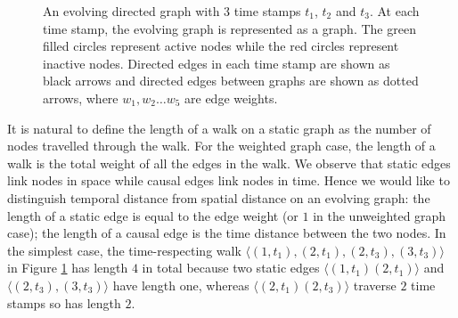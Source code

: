 \documentclass[12pt]{article}
\theoremstyle{definition}
\begin{document}
\begin{figure}[h]
 \begin{center}
\end{center}
\caption{An evolving directed graph with 3 time stamps $t_1$, $t_2$ and $t_3$.
At each time stamp, the evolving graph is represented as a graph.
The green filled circles represent active nodes while the red circles represent
inactive nodes. Directed edges in each time stamp are shown as black arrows and directed edges between graphs are shown as dotted arrows, where $w_1, w_2 \ldots w_5$ are edge weights.}
\label{fig:eg_shortest_walk}
\end{figure}

It is natural to define the length of a walk on a static graph as the number of nodes travelled through the walk. For the weighted graph case, the length of a walk is the total weight of all the edges in the walk. We observe that static edges link nodes in space while causal edges link nodes in time. Hence we would like to distinguish temporal distance from spatial distance on an evolving graph: the length of a static edge is equal to the edge weight (or $1$ in the unweighted graph case); the length of a causal edge is the time distance between the two nodes. In the simplest case, the time-respecting walk
$\langle (1, t_1) ,(2, t_1) , (2, t_3), (3, t_3)\rangle$ in Figure \ref{fig:eg_shortest_walk} has length $4$ in total because two static edges $\langle (1, t_1) (2, t_1) \rangle$ and $\langle (2, t_3), (3, t_3) \rangle$ have length one, whereas $\langle (2, t_1) (2, t_3) \rangle$ traverse $2$ time stamps so has length $2$.
\end{document}
